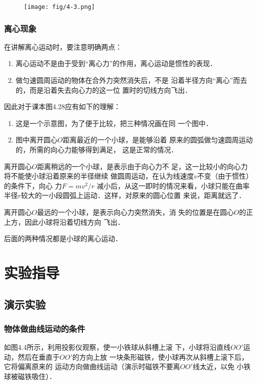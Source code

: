 \begin{figure}[htp]
    \centering
    \texttt{[image: fig/4-3.png]}
    \caption{}
\end{figure}


\subsubsection{离心现象}

在讲解离心运动时，要注意明确两点：
\begin{enumerate}
    \item 离心运动不是由于受到“离心力”的作用，离心运动是惯性的表现．
    \item 做匀速圆周运动的物体在合外力突然消失后，不是
    沿着半径方向“离心”而去的，而是沿着失去向心力的这一位
    置时的切线方向飞出．
\end{enumerate}

因此对于课本图4.28应有如下的理解：
\begin{enumerate}
    \item 这是一个示意图，为了便于比较，把三种情况画在同
一个图中．
\item 图中离开圆心$O$距离最近的一个小球，是能够沿着
原来的圆弧做匀速圆周运动的，所需的向心力能够得到满足，
这是正常的情况．
\end{enumerate}

离开圆心$O$距离稍远的一个小球，是表示由于向心力不
足，这一比较小的向心力将不能使小球沿着原来的半径继续
做圆周运动，在认为线速度$v$不变（由于惯性）的条件下，向心
力$F=mv^2/r$
减小后，从这一即时的情况来看，小球只能在曲率
半径$r$较大的一小段圆弧上运动．这样，对原来的圆心位置
来说，距离就远了．

离开圆心$O$最远的一个小球，是表示向心力突然消失，消
失的位置是在圆心$O$的正上方，因此小球将沿着切线方向
飞出．

后面的两种情况都是小球的离心运动．


\section{实验指导}
\subsection{演示实验}
\subsubsection{物体做曲线运动的条件}

如图4.4所示，利用投影仪观察，使一小铁球从斜槽上滚
下，小球将沿直线$OO'$运动，然后在垂直于$OO'$的方向上放
一块条形磁铁，使小球再次从斜槽上滚下后，它将偏离原来的
运动方向做曲线运动（演示时磁铁不要离$OO'$线太近，以免
小铁球被磁铁吸住）．


